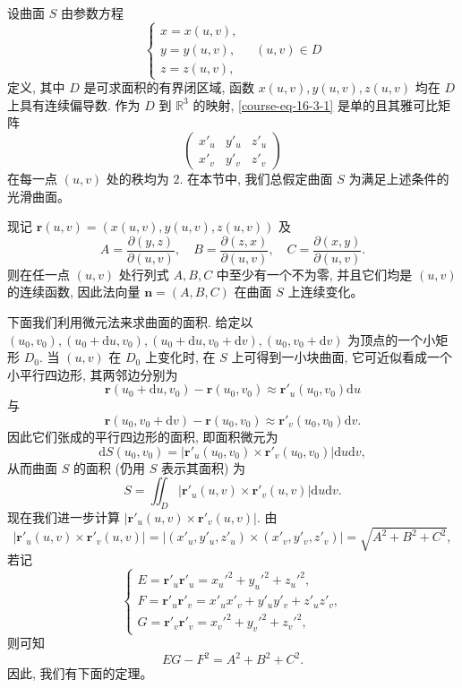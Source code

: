 \documentclass[12pt,fontset=fandol]{ctexart}
\begin{document}
设曲面 $S$ 由参数方程
\begin{equation}
  \begin{cases}
    x=x(u,v),\\
    y=y(u,v),\\
    z=z(u,v),
  \end{cases}
  \quad (u,v)\in D
  \label{course-eq-16-3-1}
\end{equation}
定义, 其中 $D$ 是可求面积的有界闭区域, 函数 $x(u,v),y(u,v),z(u,v)$ 均在 $D$ 上具有连续偏导数. 作为 $D$ 到 $\mathbb R^3$ 的映射, \eqref{course-eq-16-3-1}  是单的且其雅可比矩阵
\[
  \begin{pmatrix}
    x'_u & y'_u & z'_u\\
    x'_v & y'_v & z'_v
  \end{pmatrix}
\]
在每一点 $(u,v)$ 处的秩均为 $2$. 在本节中, 我们总假定曲面 $S$ 为满足上述条件的光滑曲面。

现记 $\boldsymbol r(u,v)=(x(u,v),y(u,v),z(u,v))$ 及
\begin{equation}
  A=\frac{\partial(y,z)}{\partial(u,v)},\quad
  B=\frac{\partial(z,x)}{\partial(u,v)},\quad
  C=\frac{\partial(x,y)}{\partial(u,v)}.
  \label{course-eq-16-3-2}
\end{equation}
则在任一点 $(u,v)$ 处行列式 $A,B,C$ 中至少有一个不为零, 并且它们均是 $(u,v)$ 的连续函数, 因此法向量 $\boldsymbol n=(A,B,C)$ 在曲面 $S$ 上连续变化。

下面我们利用微元法来求曲面的面积. 给定以 $(u_0,v_0),(u_0+\mathrm du,v_0),(u_0+\mathrm du,v_0+\mathrm dv),(u_0,v_0+\mathrm dv)$ 为顶点的一个小矩形 $D_0$. 当 $(u,v)$ 在 $D_0$ 上变化时, 在 $S$ 上可得到一小块曲面, 它可近似看成一个小平行四边形, 其两邻边分别为
\[
  \boldsymbol r(u_0+\mathrm du,v_0)-\boldsymbol r(u_0,v_0)
  \approx \boldsymbol r'_u(u_0,v_0)\mathrm du
\]
与
\[
  \boldsymbol r(u_0,v_0+\mathrm dv)-\boldsymbol r(u_0,v_0)
  \approx \boldsymbol r'_v(u_0,v_0)\mathrm dv.
\]
因此它们张成的平行四边形的面积, 即面积微元为
\[
  \mathrm dS(u_0,v_0)=|\boldsymbol r'_u(u_0,v_0)\times\boldsymbol r'_v(u_0,v_0)|\mathrm du\mathrm dv,
\]
从而曲面 $S$ 的面积 (仍用 $S$ 表示其面积) 为
\[
  S=\iint_D |\boldsymbol r'_u(u,v)\times\boldsymbol r'_v(u,v)|\mathrm du\mathrm dv.
\]
现在我们进一步计算 $|\boldsymbol r'_u(u,v)\times\boldsymbol r'_v(u,v)|$. 由
\[
  |\boldsymbol r'_u(u,v)\times\boldsymbol r'_v(u,v)|
  =|(x'_u,y'_u,z'_u)\times(x'_v,y'_v,z'_v)|
  =\sqrt{A^2+B^2+C^2},
\]
若记
\begin{equation}
  \begin{cases}
    E=\boldsymbol r'_u\boldsymbol r'_u=x_u'^2+y_u'^2+z_u'^2,\\
    F=\boldsymbol r'_u\boldsymbol r'_v=x'_ux'_v+y'_uy'_v+z'_uz'_v,\\
    G=\boldsymbol r'_v\boldsymbol r'_v=x_v'^2+y_v'^2+z_v'^2,
  \end{cases}
  \label{course-eq-16-3-3}
\end{equation}
则可知
\[
  EG-F^2=A^2+B^2+C^2.
\]
因此, 我们有下面的定理。
\end{document}
